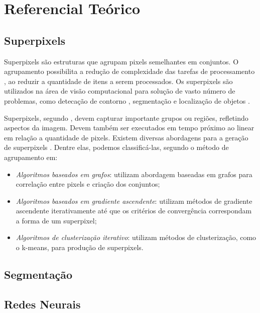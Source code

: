 \begin{document}
\section{Referencial Teórico} \label{sec:ref_teorico}

\subsection{Superpixels} \label{ssec:superpixels}

Superpixels são estruturas que agrupam pixels semelhantes em conjuntos. O agrupamento possibilita a redução de complexidade das tarefas de processamento \cite{SLIC}, ao reduzir a quantidade de itens a serem processados. Os superpixels são utilizados na área de visão computacional para solução de vasto número de problemas, como detecação de contorno \cite{CONTOUR}, segmentação \cite{SEG_MERGE} e localização de objetos \cite{SEG_LOCALIZ}.

Superpixels, segundo \cite{FELZENSWALB}, devem capturar importante grupos ou regiões, refletindo aspectos da imagem. Devem também ser executados em tempo próximo ao linear em relação a quantidade de pixels. Existem diversas abordagens para a geração de superpixels \cite{SLIC}. Dentre elas, podemos classificá-las, segundo o método de agrupamento em: 

\begin{itemize}
 \item \textit{Algoritmos baseados em grafos}: utilizam abordagem baseadas em grafos para correlação entre pixels e criação dos conjuntos;
 \item \textit{Algoritmos baseados em gradiente ascendente}: utilizam métodos de gradiente ascendente iterativamente até que os critérios de convergência correspondam a forma de um superpixel; 
 \item \textit{Algoritmos de clusterização iterativo}: utilizam métodos de clusterização, como o k-means, para produção de superpixels.
\end{itemize}


\subsection{Segmentação} \label{ssec:segmentacao}

\subsection{Redes Neurais} \label{ssec:redes_neurais}
\end{document}
